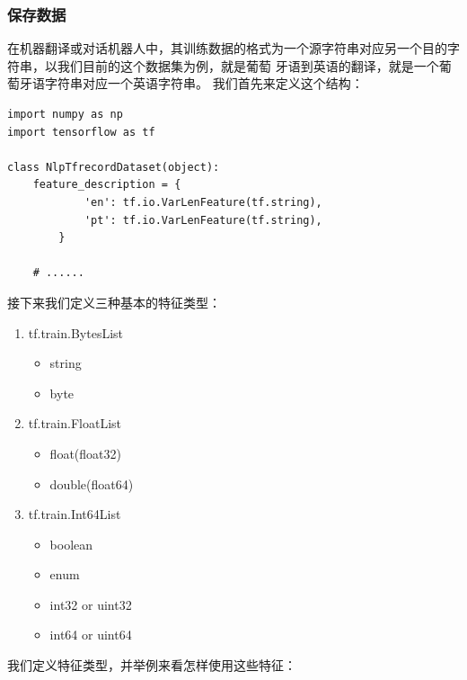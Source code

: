 \documentclass{article}
\begin{document}
\subsubsection{保存数据}
在机器翻译或对话机器人中，其训练数据的格式为一个源字符串对应另一个目的字符串，以我们目前的这个数据集为例，就是葡萄
牙语到英语的翻译，就是一个葡萄牙语字符串对应一个英语字符串。\newline
我们首先来定义这个结构：
\begin{lstlisting}
import numpy as np
import tensorflow as tf

class NlpTfrecordDataset(object):
    feature_description = {
            'en': tf.io.VarLenFeature(tf.string), 
            'pt': tf.io.VarLenFeature(tf.string),
        }
    
    # ......
\end{lstlisting}
接下来我们定义三种基本的特征类型：
\begin{enumerate}
\item tf.train.BytesList
    \begin{itemize}
        \item string
        \item byte
    \end{itemize}
\item tf.train.FloatList
    \begin{itemize}
        \item float(float32)
        \item double(float64)
    \end{itemize}
\item tf.train.Int64List
    \begin{itemize}
        \item boolean
        \item enum
        \item int32 or uint32
        \item int64 or uint64
    \end{itemize}
\end{enumerate}
我们定义特征类型，并举例来看怎样使用这些特征：
\end{document}
